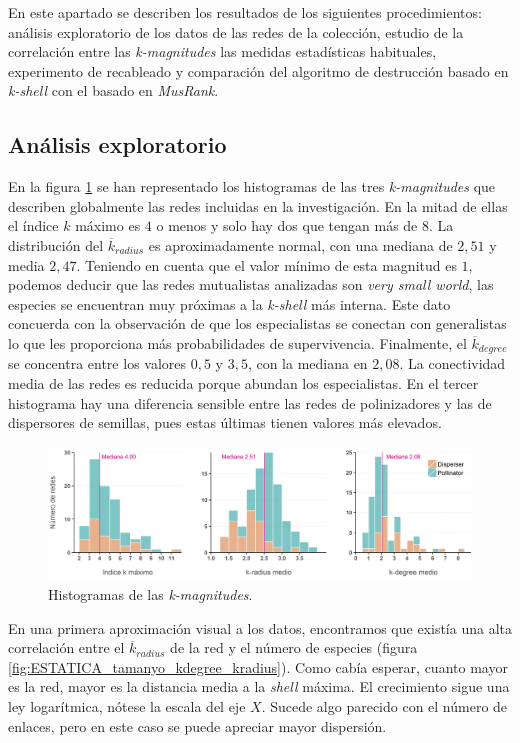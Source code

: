 En este apartado se describen los resultados de los siguientes procedimientos: análisis exploratorio de los datos de las redes de la colección, estudio de la correlación entre las \textit{k-magnitudes} las medidas estadísticas habituales, experimento de recableado y comparación del algoritmo de destrucción basado en \textit{k-shell} con el basado en \textit{MusRank}.

\subsection{Análisis exploratorio}

En la figura \ref{fig:ESTATICA_hist_kmagnitudes} se han representado los histogramas de las tres \textit{k-magnitudes} que describen globalmente las redes incluidas en la investigación. En la mitad de ellas el índice $k$ máximo es $4$ o menos y solo hay dos que tengan más de $8$. La distribución del $\overline{k}_{radius}$ es aproximadamente normal, con una mediana de $2,51$ y media $2,47$. Teniendo en cuenta que el valor mínimo de esta magnitud es $1$, podemos deducir que las redes mutualistas analizadas son \textit{very small world}, las especies se encuentran muy próximas a la \textit{k-shell} más interna. Este dato concuerda con la observación de que los especialistas se conectan con generalistas lo que les proporciona más probabilidades de supervivencia. Finalmente, el $\overline{k}_{degree}$ se
concentra entre los valores $0,5$ y $3,5$, con la mediana en $2,08$. La conectividad media de las redes es reducida
porque abundan los especialistas. En el tercer histograma hay una diferencia sensible entre las redes de polinizadores
y las de dispersores de semillas, pues estas últimas tienen valores más elevados.

\begin{figure}[h!]
\centering
\includegraphics[scale=0.48]{Figures/ESTATICA_hist_kmagnitudes.png}
\caption{Histogramas de las \textit{k-magnitudes}.}
\label{fig:ESTATICA_hist_kmagnitudes}
\end{figure}

En una primera aproximación visual a los datos, encontramos que existía una alta correlación entre el $\overline{k}_{radius}$ de la red y el número de especies (figura \ref{fig:ESTATICA_tamanyo_kdegree_kradius}). Como cabía esperar, cuanto mayor es la red, mayor es la distancia media a la \textit{shell} máxima. El crecimiento sigue una ley logarítmica, nótese la escala del eje $X$. Sucede algo parecido con el número de enlaces, pero en este caso se puede apreciar mayor dispersión. 

